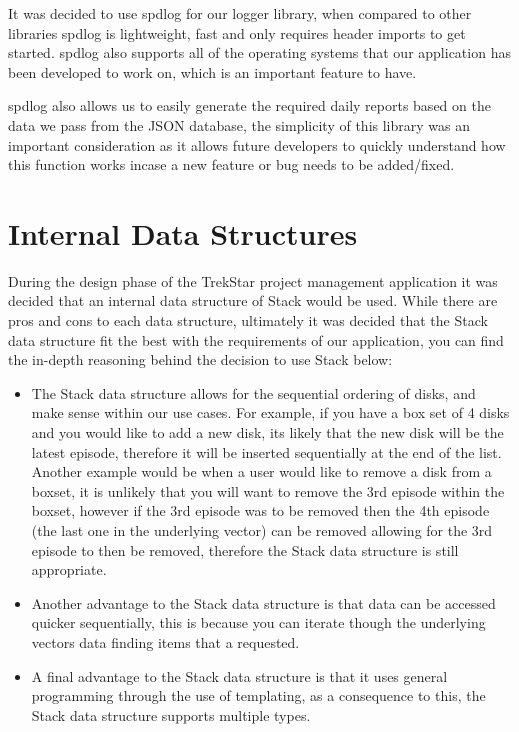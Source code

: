 \documentclass[
  english,
  a4paper,
,tablecaptionabove
]{scrartcl}
\providecommand{\tightlist}{%
  \setlength{\itemsep}{0pt}\setlength{\parskip}{0pt}}
\begin{document}
It was decided to use spdlog for our logger library, when compared to
other libraries spdlog is lightweight, fast and only requires header
imports to get started. spdlog also supports all of the operating
systems that our application has been developed to work on, which is an
important feature to have.

spdlog also allows us to easily generate the required daily reports
based on the data we pass from the JSON database, the simplicity of this
library was an important consideration as it allows future developers to
quickly understand how this function works incase a new feature or bug
needs to be added/fixed.

\newpage

\hypertarget{internal-data-structures}{%
\section{Internal Data Structures}\label{internal-data-structures}}

During the design phase of the TrekStar project management application
it was decided that an internal data structure of Stack would be used.
While there are pros and cons to each data structure, ultimately it was
decided that the Stack data structure fit the best with the requirements
of our application, you can find the in-depth reasoning behind the
decision to use Stack below:

\begin{itemize}
\tightlist
\item
  The Stack data structure allows for the sequential ordering of disks,
  and make sense within our use cases. For example, if you have a box
  set of 4 disks and you would like to add a new disk, its likely that
  the new disk will be the latest episode, therefore it will be inserted
  sequentially at the end of the list. Another example would be when a
  user would like to remove a disk from a boxset, it is unlikely that
  you will want to remove the 3rd episode within the boxset, however if
  the 3rd episode was to be removed then the 4th episode (the last one
  in the underlying vector) can be removed allowing for the 3rd episode
  to then be removed, therefore the Stack data structure is still
  appropriate.
\item
  Another advantage to the Stack data structure is that data can be
  accessed quicker sequentially, this is because you can iterate though
  the underlying vectors data finding items that a requested.
\item
  A final advantage to the Stack data structure is that it uses general
  programming through the use of templating, as a consequence to this,
  the Stack data structure supports multiple types.
\end{itemize}
\end{document}
